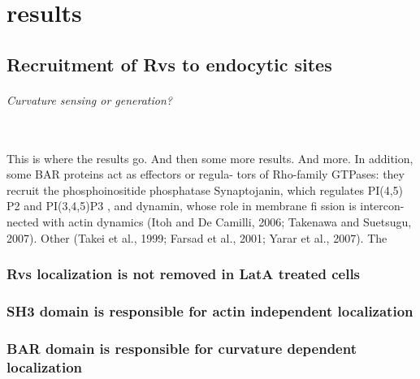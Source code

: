 \chapter{results}    \label{results}
\section{Recruitment of Rvs to endocytic sites}

	\subparagraph{Curvature sensing or generation? }
	\mbox{}\\
	This is where the results go. And then some more results. And more.
In addition, some BAR proteins act as effectors or regula- tors of Rho-family GTPases: they recruit the phosphoinositide phosphatase Synaptojanin, which regulates PI(4,5) P2
and PI(3,4,5)P3 , and dynamin, whose
role in membrane fi ssion is intercon- nected with actin dynamics (Itoh and De Camilli, 2006; Takenawa and Suetsugu,
2007). Other
(Takei et al., 1999; Farsad et al., 2001; Yarar et al., 2007). The


	\subsection{Rvs localization is not removed in LatA treated cells}
	\subsection{SH3 domain is responsible for actin independent  localization}
	\subsection{BAR domain is responsible for curvature dependent localization}